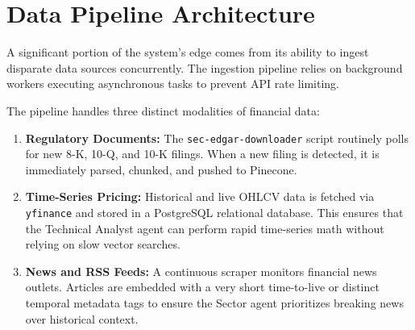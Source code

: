 \section{Data Pipeline Architecture}

A significant portion of the system's edge comes from its ability to ingest disparate data sources concurrently. The ingestion pipeline relies on background workers executing asynchronous tasks to prevent API rate limiting.

The pipeline handles three distinct modalities of financial data:
\begin{enumerate}
    \item \textbf{Regulatory Documents:} The \texttt{sec-edgar-downloader} script routinely polls for new 8-K, 10-Q, and 10-K filings. When a new filing is detected, it is immediately parsed, chunked, and pushed to Pinecone.
    \item \textbf{Time-Series Pricing:} Historical and live OHLCV data is fetched via \texttt{yfinance} and stored in a PostgreSQL relational database. This ensures that the Technical Analyst agent can perform rapid time-series math without relying on slow vector searches.
    \item \textbf{News and RSS Feeds:} A continuous scraper monitors financial news outlets. Articles are embedded with a very short time-to-live or distinct temporal metadata tags to ensure the Sector agent prioritizes breaking news over historical context.
\end{enumerate}
